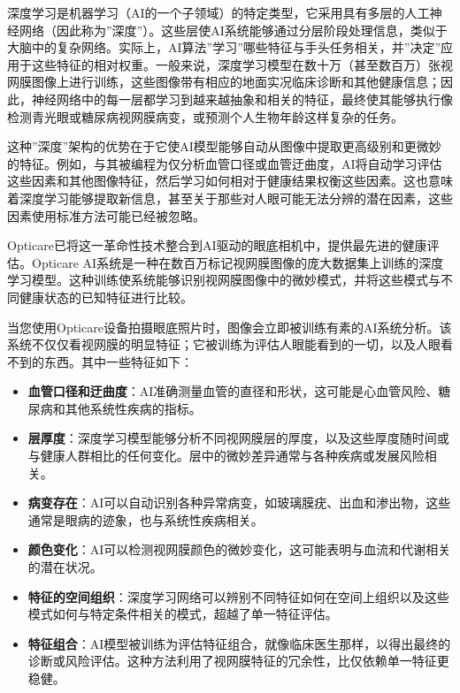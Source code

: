 \documentclass[
  Letterpaper,
]{scrbook}
\providecommand{\tightlist}{%
  \setlength{\itemsep}{0pt}\setlength{\parskip}{0pt}}\usepackage{longtable,booktabs,array}
\begin{document}
深度学习是机器学习（AI的一个子领域）的特定类型，它采用具有多层的人工神经网络（因此称为''深度''）。这些层使AI系统能够通过分层阶段处理信息，类似于大脑中的复杂网络。实际上，AI算法''学习''哪些特征与手头任务相关，并''决定''应用于这些特征的相对权重。一般来说，深度学习模型在数十万（甚至数百万）张视网膜图像上进行训练，这些图像带有相应的地面实况临床诊断和其他健康信息；因此，神经网络中的每一层都学习到越来越抽象和相关的特征，最终使其能够执行像检测青光眼或糖尿病视网膜病变，或预测个人生物年龄这样复杂的任务。

这种''深度''架构的优势在于它使AI模型能够自动从图像中提取更高级别和更微妙的特征。例如，与其被编程为仅分析血管口径或血管迂曲度，AI将自动学习评估这些因素和其他图像特征，然后学习如何相对于健康结果权衡这些因素。这也意味着深度学习能够提取新信息，甚至关于那些对人眼可能无法分辨的潜在因素，这些因素使用标准方法可能已经被忽略。

Opticare已将这一革命性技术整合到AI驱动的眼底相机中，提供最先进的健康评估。Opticare
AI系统是一种在数百万标记视网膜图像的庞大数据集上训练的深度学习模型。这种训练使系统能够识别视网膜图像中的微妙模式，并将这些模式与不同健康状态的已知特征进行比较。

当您使用Opticare设备拍摄眼底照片时，图像会立即被训练有素的AI系统分析。该系统不仅仅看视网膜的明显特征；它被训练为评估人眼能看到的一切，以及人眼看不到的东西。其中一些特征如下：

\begin{itemize}
\tightlist
\item
  \textbf{血管口径和迂曲度}：AI准确测量血管的直径和形状，这可能是心血管风险、糖尿病和其他系统性疾病的指标。
\item
  \textbf{层厚度}：深度学习模型能够分析不同视网膜层的厚度，以及这些厚度随时间或与健康人群相比的任何变化。层中的微妙差异通常与各种疾病或发展风险相关。
\item
  \textbf{病变存在}：AI可以自动识别各种异常病变，如玻璃膜疣、出血和渗出物，这些通常是眼病的迹象，也与系统性疾病相关。
\item
  \textbf{颜色变化}：AI可以检测视网膜颜色的微妙变化，这可能表明与血流和代谢相关的潜在状况。
\item
  \textbf{特征的空间组织}：深度学习网络可以辨别不同特征如何在空间上组织以及这些模式如何与特定条件相关的模式，超越了单一特征评估。
\item
  \textbf{特征组合}：AI模型被训练为评估特征组合，就像临床医生那样，以得出最终的诊断或风险评估。这种方法利用了视网膜特征的冗余性，比仅依赖单一特征更稳健。
\end{itemize}
\end{document}
